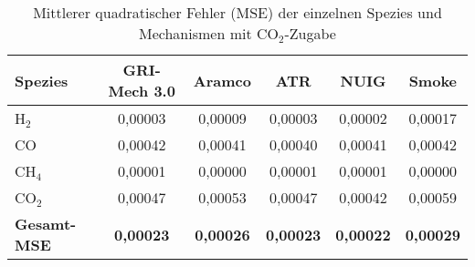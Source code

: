             \begin{table}[H]
                \centering
                \caption{Mittlerer quadratischer Fehler (MSE) der einzelnen Spezies und Mechanismen mit CO$_2$-Zugabe}
                \label{tab:mse_co2}
                \begin{tabular}{lccccc}
                    \toprule
                    \textbf{Spezies} & \textbf{GRI-Mech 3.0} & \textbf{Aramco} & \textbf{ATR} & \textbf{NUIG} & \textbf{Smoke} \\
                    \midrule
                    H$_2$          & 0{,}00003 & 0{,}00009 & 0{,}00003 & 0{,}00002 & 0{,}00017 \\
                    CO             & 0{,}00042 & 0{,}00041 & 0{,}00040 & 0{,}00041 & 0{,}00042 \\
                    CH$_4$         & 0{,}00001 & 0{,}00000 & 0{,}00001 & 0{,}00001 & 0{,}00000 \\
                    CO$_2$         & 0{,}00047 & 0{,}00053 & 0{,}00047 & 0{,}00042 & 0{,}00059 \\
                    \midrule
                    \textbf{Gesamt-MSE} & \textbf{0{,}00023} & \textbf{0{,}00026} & \textbf{0{,}00023} & \textbf{0{,}00022} & \textbf{0{,}00029} \\
                    \bottomrule
                \end{tabular}
            \end{table}
